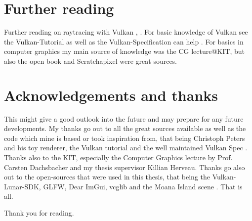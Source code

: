 \section{Further reading}
Further reading on raytracing with Vulkan \cite{vulkanNvidia}, \cite{vulkanRayTracing}. For basic knowledge of Vulkan see the Vulkan-Tutorial \cite{vulkanTutorial} as well as the Vulkan-Specification can help \cite{vulkanSpec}. For basics in computer graphics my main source of knowledge was the CG lecture@KIT, but also the open book \cite{pbrBook} and Scratchapixel \cite{scrathAPixel} were great sources.

\section*{Acknowledgements and thanks}
This might give a good outlook into the future and may prepare for any future developments. My thanks go out to all the great sources available as well as the code which mine is based or took inspiration from, that being Christoph Peters \cite{momentsingraphics} and his toy renderer, the Vulkan tutorial \cite{vulkanTutorial}and the well maintained Vulkan Spec \cite{vulkanSpec}. Thanks also to the KIT, especially the Computer Graphics lecture by Prof. Carsten Dachsbacher and my thesis supervisor Killian Herveau.  Thanks go also out to the open-sources that were used in this thesis, that being the Vulkan-Lunar-SDK, GLFW, Dear ImGui, vcglib and the Moana Island scene \cite{moanaIsland}. That is all.

\begin{center}
    Thank you for reading.
\end{center}